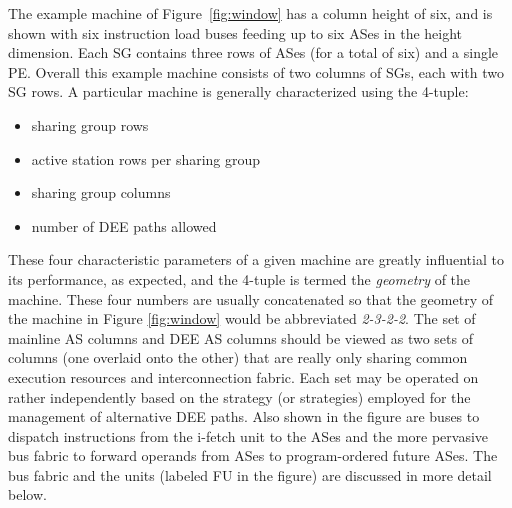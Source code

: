 \documentclass{book}
\begin{document}
The example machine of Figure~\ref{fig:window} has a column height of
six, and is shown with six instruction load buses feeding up to
six ASes in the height dimension.
Each SG contains three rows of ASes
(for a total of six) and a single PE.
Overall this example machine
consists of two columns of SGs, each with two SG rows.
A particular machine is generally characterized using the 4-tuple: 
%
\begin{itemize}
\item{sharing group rows}
\vspace{-0.10in}
\item{active station rows per sharing group}
\vspace{-0.10in}
\item{sharing group columns}
\vspace{-0.10in}
\item{number of DEE paths allowed}
\end{itemize}   
%
These four characteristic parameters of a given machine
are greatly influential to its performance, as expected,
and the 4-tuple is termed the \textit{geometry} 
of the machine.
These four numbers are usually concatenated
so that the geometry of the machine in Figure \ref{fig:window}
would be abbreviated {\em 2-3-2-2}.
The set of mainline AS columns and DEE AS columns should be
viewed as two sets of columns (one overlaid onto the other)
that are really only sharing
common execution resources and interconnection fabric.
Each set may be operated on rather independently based on
the strategy (or strategies) employed for the management of
alternative DEE paths.
Also shown in the figure are buses to dispatch instructions
from the i-fetch unit to the ASes and the more pervasive
bus fabric to forward operands from ASes to program-ordered future
ASes.  The bus fabric and the units (labeled FU in the figure) are
discussed in more detail below.
\end{document}
